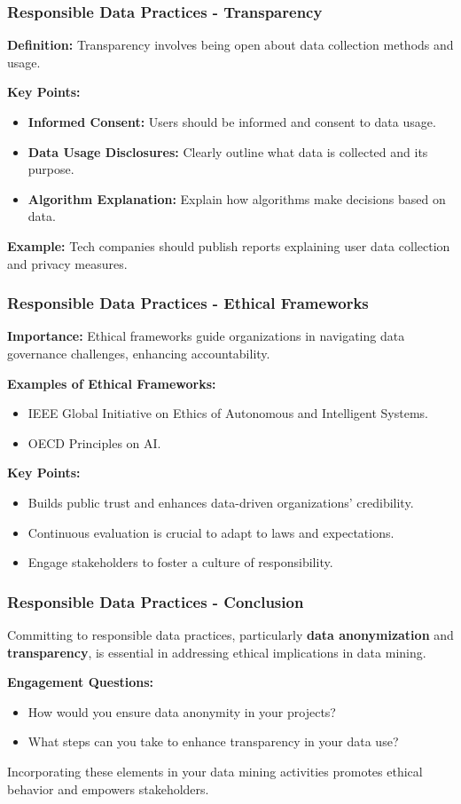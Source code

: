 \documentclass{beamer}
\begin{document}
\begin{frame}[fragile]
    \frametitle{Responsible Data Practices - Transparency}
    \textbf{Definition:} Transparency involves being open about data collection methods and usage.

    \textbf{Key Points:}
    \begin{itemize}
        \item \textbf{Informed Consent:} Users should be informed and consent to data usage.
        \item \textbf{Data Usage Disclosures:} Clearly outline what data is collected and its purpose.
        \item \textbf{Algorithm Explanation:} Explain how algorithms make decisions based on data.
    \end{itemize}

    \textbf{Example:} Tech companies should publish reports explaining user data collection and privacy measures.
\end{frame}

\begin{frame}[fragile]
    \frametitle{Responsible Data Practices - Ethical Frameworks}
    \textbf{Importance:} Ethical frameworks guide organizations in navigating data governance challenges, enhancing accountability.

    \textbf{Examples of Ethical Frameworks:}
    \begin{itemize}
        \item IEEE Global Initiative on Ethics of Autonomous and Intelligent Systems.
        \item OECD Principles on AI.
    \end{itemize}

    \textbf{Key Points:}
    \begin{itemize}
        \item Builds public trust and enhances data-driven organizations' credibility.
        \item Continuous evaluation is crucial to adapt to laws and expectations.
        \item Engage stakeholders to foster a culture of responsibility.
    \end{itemize}
\end{frame}

\begin{frame}[fragile]
    \frametitle{Responsible Data Practices - Conclusion}
    Committing to responsible data practices, particularly \textbf{data anonymization} and \textbf{transparency}, is essential in addressing ethical implications in data mining.

    \textbf{Engagement Questions:}
    \begin{itemize}
        \item How would you ensure data anonymity in your projects?
        \item What steps can you take to enhance transparency in your data use?
    \end{itemize}

    Incorporating these elements in your data mining activities promotes ethical behavior and empowers stakeholders.
\end{frame}
\end{document}
